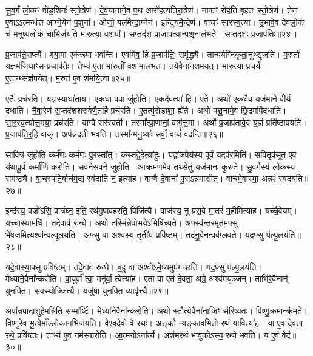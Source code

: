 सु॒व॒र्गं लो॒कꣳ षो॑ड॒शिनः॑ स्तो॒त्रेण॑।
दे॒व॒याना॑ने॒व प॒थ आरो॑हत्यतिरा॒त्रेण॑।
नाकꣳ॑ रोहति बृह॒तः स्तो॒त्रेण॑।
तेज॑ ए॒वाऽऽत्मन्ध॑त्त आग्ने॒येन॑ प॒शुना᳚।
ओजो॒ बल॑मैन्द्रा॒ग्नेन॑।
इ॒न्द्रि॒यमै॒न्द्रेण॑।
वाचꣳ॑ सारस्व॒त्या।
उ॒भावे॒व दे॑वलो॒कं च॑ मनुष्यलो॒कं चा॒भि\-ज॑यति मारु॒त्या व॒शया᳚।
स॒प्तद॑श प्राजाप॒त्यान्प॒शूनाल॑भते।
स॒प्त॒द॒शः प्र॒जा\-प॑तिः॥२४॥\ip

प्र॒जा\-प॑ते॒राप्त्यै᳚।
श्या॒मा एक॑रूपा भवन्ति।
ए॒वमि॑व॒ हि प्र॒जा\-प॑तिः॒ समृ॑द्ध्यै।
तान्पर्य॑ग्निकृता॒नुथ्सृ॑जति।
म॒रुतो॑ य॒ज्ञ\-म॑जिघाꣳ\-सन्प्र॒जा\-प॑तेः।
तेभ्य॑ ए॒तां मा॑रु॒तीं व॒शामाल॑भत।
तयै॒वैना॑नशमयत्।
मा॒रु॒त्या प्र॒चर्य॑।
ए॒तान्थ्संज्ञ॑पयेत्।
म॒रुत॑ ए॒व श॑मयि॒त्वा॥२५॥\ip

ए॒तैः प्रच॑रति।
य॒ज्ञस्याघा॑ताय।
ए॒क॒धा व॒पा जु॑होति।
ए॒क॒दे॒व॒त्या॑ हि।
ए॒ते।
अथो॑ एक॒धैव यज॑माने वी॒र्यं॑ दधाति।
नै॒वा॒रेण॑ स॒प्तद॑शशरावेणै॒तर्\mbox{}हि॒ प्रच॑रति।
ए॒तत्पु॑रोडाशा॒ ह्ये॑ते।
अथो॑ पशू॒नामे॒व छि॒द्रमपि॑दधाति।
सा॒र॒स्व॒त्योत्त॒मया॒ प्रच॑रति।
वाग्वै सर॑स्वती।
तस्मा᳚त्प्रा॒णानां॒ वागु॑त्त॒मा।
अथो᳚ प्र॒जा\-प॑तावे॒व य॒ज्ञं प्रति॑\-ष्ठापयति।
प्र॒जा\-प॑ति॒र्‌॒\mbox{}हि वाक्।
अप॑न्नदती भवति।
तस्मा᳚न्मनु॒ष्याः᳚ सर्वां॒ वाचं॑ वदन्ति॥२६॥\ip\anuvakamend[अ॒ति॒रा॒त्रम॒न्तरि॑क्षमु॒क्थ्ये॑न प्र॒जा\-प॑तिः शमयि॒त्वोत्त॒मया॒ प्रच॑रति॒ षट् च॑]

सा॒वि॒त्रं जु॑होति॒ कर्म॑णः कर्मणः पु॒रस्ता᳚त्।
कस्तद्वे॒देत्या॑हुः।
यद्वा॑ज॒पेय॑स्य॒ पूर्वं॒ यदप॑र॒मिति॑।
स॒वि॒तृप्र॑सूत ए॒व य॑थापू॒र्वं कर्मा॑णि करोति।
सव॑नेसवने जुहोति।
आ॒क्रम॑णमे॒व तथ्सेतुं॒ यज॑मानः कुरुते।
सु॒व॒र्गस्य॑ लो॒कस्य॒ सम॑ष्ट्यै।
वा॒चस्पति॒र्वाच॑म॒द्य स्व॑दाति न॒ इत्या॑ह।
वाग्वै दे॒वानां᳚ पु॒रा\-ऽन्न॑मासीत्।
वाच॑मे॒वास्मा॒ अन्नꣴ॑ स्वदयति॥२७॥\ip

इन्द्र॑स्य॒ वज्रो॑ऽसि॒ वार्त्र॑घ्न॒ इति॒ रथ॑मु॒पाव॑\-हरति॒ विजि॑त्यै।
वाज॑स्य॒ नु प्र॑स॒वे मा॒तरं॑ म॒हीमित्या॑ह।
यच्चै॒वेयम्।
यच्चा॒स्यामधि॑।
तदे॒वाव॑ रुन्धे।
अथो॒ तस्मि॑न्ने॒वोभये॒\-ऽभि\-षि॑च्यते।
अ॒फ्स्व॑न्तर॒मृत॑\-म॒फ्सु भे॑ष॒जमित्यश्वा᳚न्पल्पूलयति।
अ॒फ्सु वा अश्व॑स्य॒ तृती॑यं॒ प्रवि॑ष्टम्।
तद॑नु॒वेन॒न्वव॑प्लवते।
यद॒फ्सु प॑ल्पू॒लय॑ति॥२८॥\ip

यदे॒वास्या॒फ्सु प्रवि॑ष्टम्।
तदे॒वाव॑ रुन्धे।
ब॒हु वा अश्वो॑\-ऽमे॒ध्यमुप॑\-गच्छति।
यद॒फ्सु प॑ल्पू॒लय॑ति।
मेध्या॑ने॒वै\-ना᳚न्करोति।
वा॒युर्वा᳚ त्वा॒ मनु॑र्वा॒ त्वेत्या॑ह।
ए॒ता वा ए॒तं दे॒वता॒ अग्रे॒ अश्व॑मयुञ्जन्।
ताभि॑रे॒वैनान्॑ युनक्ति।
स॒वस्योज्जि॑त्यै।
यजु॑षा युनक्ति॒ व्यावृ॑त्त्यै॥२९॥\ip

अपा᳚न्नपादाशुहेम॒न्निति॒ सम्मा᳚र्ष्टि।
मेध्या॑ने॒वैना᳚न्करोति।
अथो॒ स्तौत्ये॒वैना॑ना॒जिꣳ स॑रिष्य॒तः।
वि॒ष्णु॒क्र॒मान्क्र॑मते।
विष्णु॑रे॒व भू॒त्वेमाँल्लो॒कान॒भि\-ज॑यति।
वै॒श्व॒दे॒वो वै रथः॑।
अ॒ङ्कौ न्य॒ङ्काव॒भितो॒ रथं॒ यावित्या॑ह।
या ए॒व दे॒वता॒ रथे॒ प्रवि॑ष्टाः।
ताभ्य॑ ए॒व नम॑स्करोति।
आ॒त्मनो\-ऽना᳚र्त्यै।
अश॑मरथं भावुको\-ऽस्य॒ रथो॑ भवति।
य ए॒वं वेद॑॥३०॥\ip\anuvakamend[स्व॒द॒य॒ति॒ प॒ल्पू॒लय॑ति॒ व्यावृ॑त्त्या॒ अना᳚र्त्यै॒ द्वे च॑]

